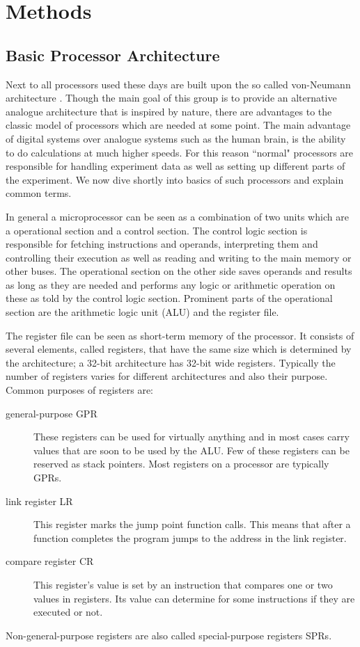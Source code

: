 \chapter{Methods}
\label{chapter:methods}

\section{Basic Processor Architecture}
\label{section:processor}

Next to all processors used these days are built upon the so called von-Neumann architecture .
Though the main goal of this group is to provide an alternative analogue architecture that is inspired by nature, there are advantages to the classic model of processors which are needed at some point.
The main advantage of digital systems over analogue systems such as the human brain, is the ability to do calculations at much higher speeds.
For this reason ``normal" processors are responsible for handling experiment data as well as setting up different parts of the experiment.
We now dive shortly into basics of such processors and explain common terms.

In general a microprocessor can be seen as a combination of two units which are a operational section and a control section.
The control logic section is responsible for fetching instructions and operands, interpreting them and controlling their execution as well as reading and writing to the main memory or other buses.
The operational section on the other side saves operands and results as long as they are needed and performs any logic or arithmetic operation on these as told by the control logic section.
Prominent parts of the operational section are the arithmetic logic unit (ALU) and the register file.

The register file can be seen as short-term memory of the processor.
It consists of several elements, called registers, that have the same size which is determined by the architecture; a 32-bit architecture has 32-bit wide registers.
Typically the number of registers varies for different architectures and also their purpose.
Common purposes of registers are:
\begin{description}
    \item[general-purpose GPR] These registers can be used for virtually anything and in most cases carry values that are soon to be used by the ALU. Few of these registers can be reserved as stack pointers. Most registers on a processor are typically GPRs.
    \item[link register LR] This register marks the jump point function calls. This means that after a function completes the program jumps to the address in the link register.
    \item[compare register CR] This register's value is set by an instruction that compares one or two values in registers. Its value can determine for some instructions if they are executed or not.
\end{description}        
Non-general-purpose registers are also called special-purpose registers SPRs.

